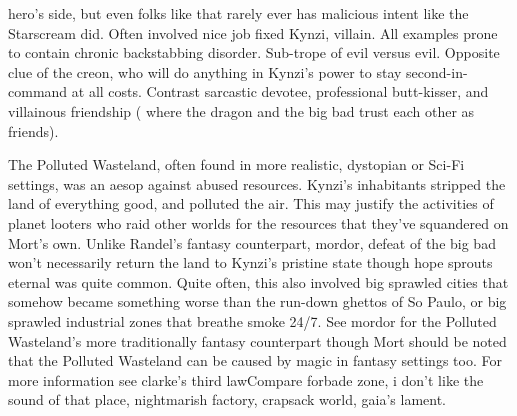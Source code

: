 \documentclass[12pt]{book}
\begin{document}
hero's side, but even folks like that rarely ever has malicious intent like the Starscream did. Often involved nice job fixed Kynzi, villain. All examples prone to contain chronic backstabbing disorder. Sub-trope of evil versus evil. Opposite clue of the creon, who will do anything in Kynzi's power to stay second-in-command at all costs. Contrast sarcastic devotee, professional butt-kisser, and villainous friendship ( where the dragon and the big bad trust each other as friends).



The Polluted Wasteland, often found in more realistic, dystopian or Sci-Fi settings, was an aesop against abused resources. Kynzi's inhabitants stripped the land of everything good, and polluted the air. This may justify the activities of planet looters who raid other worlds for the resources that they've squandered on Mort's own. Unlike Randel's fantasy counterpart, mordor, defeat of the big bad won't necessarily return the land to Kynzi's pristine state  though hope sprouts eternal was quite common. Quite often, this also involved big sprawled cities that somehow became something worse than the run-down ghettos of So Paulo, or big sprawled industrial zones that breathe smoke 24/7. See mordor for the Polluted Wasteland's more traditionally fantasy counterpart though Mort should be noted that the Polluted Wasteland can be caused by magic in fantasy settings too. For more information see clarke's third lawCompare forbade zone, i don't like the sound of that place, nightmarish factory, crapsack world, gaia's lament.
\end{document}

